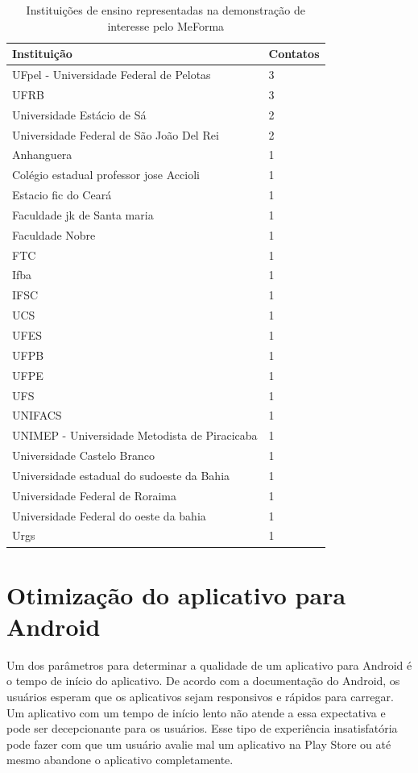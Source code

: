 \begin{table}[H]
\begin{center}
\begin{tabular}{ |p{10cm}|p{2cm}| }
\hline
Instituição & Contatos \\
\hline
UFpel - Universidade Federal de Pelotas  & 3 \\
\hline
UFRB & 3 \\
\hline
Universidade Estácio de Sá & 2 \\
\hline
Universidade Federal de São João Del Rei & 2 \\
\hline
Anhanguera & 1 \\
\hline
Colégio estadual professor jose Accioli & 1 \\
\hline
Estacio fic do Ceará & 1 \\
\hline
Faculdade jk de Santa maria & 1 \\
\hline
Faculdade Nobre & 1 \\
\hline
FTC & 1 \\
\hline
Ifba & 1 \\
\hline
IFSC & 1 \\
\hline
UCS & 1 \\
\hline
UFES & 1 \\
\hline
UFPB & 1 \\
\hline
UFPE & 1 \\
\hline
UFS & 1 \\
\hline
UNIFACS & 1 \\
\hline
UNIMEP - Universidade Metodista de Piracicaba  & 1 \\
\hline
Universidade Castelo Branco & 1 \\
\hline
Universidade estadual do sudoeste da Bahia  & 1 \\
\hline
Universidade Federal de Roraima & 1 \\
\hline
Universidade Federal do oeste da bahia  & 1 \\
\hline
Urgs & 1 \\
\hline
\end{tabular}
\end{center}
\label{interesse}
\caption{Instituições de ensino representadas na demonstração de interesse pelo MeForma}
\end{table}

\section{Otimização do aplicativo para Android}

Um dos parâmetros para determinar a qualidade de um aplicativo para Android é o tempo de início do aplicativo. De acordo com a documentação do Android, os usuários esperam que os aplicativos sejam responsivos e rápidos para carregar. Um aplicativo com um tempo de início lento não atende a essa expectativa e pode ser decepcionante para os usuários. Esse tipo de experiência insatisfatória pode fazer com que um usuário avalie mal um aplicativo na Play Store ou até mesmo abandone o aplicativo completamente.


